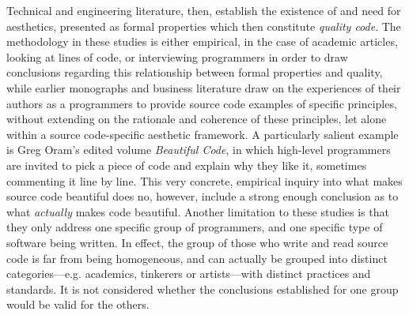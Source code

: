 Technical and engineering literature, then, establish the existence of and need for aesthetics, presented as formal properties which then constitute \emph{quality code}. The methodology in these studies is either empirical, in the case of academic articles, looking at lines of code, or interviewing programmers in order to draw conclusions regarding this relationship between formal properties and quality, while earlier monographs and business literature draw on the experiences of their authors as a programmers to provide source code examples of specific principles, without extending on the rationale and coherence of these principles, let alone within a source code-specific aesthetic framework. A particularly salient example is Greg Oram's edited volume \emph{Beautiful Code}, in which high-level programmers are invited to pick a piece of code and explain why they like it, sometimes commenting it line by line\cite{oram_beautiful_2007}. This very concrete, empirical inquiry into what makes source code beautiful does no, however, include a strong enough conclusion as to what \emph{actually} makes code beautiful. Another limitation to these studies is that they only address one specific group of programmers, and one specific type of software being written. In effect, the group of those who write and read source code is far from being homogeneous, and can actually be grouped into distinct categories—e.g. academics, tinkerers or artists—with distinct practices and standards\cite{hayes_cultures_2017}. It is not considered whether the conclusions established for one group would be valid for the others.

